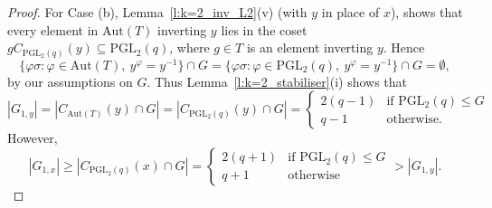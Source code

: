 \documentclass[twoside,a4paper,reqno,11pt]{amsart}
\newcommand{\<}{\langle}
\renewcommand{\>}{\rangle}
\newcommand{\leqs}{\leqslant}
\newcommand{\geqs}{\geqslant}
\newcommand{\Aut}{\mathrm{Aut}}
\newcommand{\PGL}{\mathrm{PGL}}
\theoremstyle{definition}
\begin{document}
\begin{proof}
    For Case (b), 
     Lemma~\ref{l:k=2_inv_L2}(v) (with $y$ in place of $x$), shows that every element in $\Aut(T)$ inverting $y$ lies in the coset $gC_{\PGL_2(q)}(y)\subseteq \PGL_2(q)$, where $g\in T$ is an element inverting $y$. Hence
    \begin{equation*}
        \{\varphi\sigma : \varphi  \in \Aut(T),  \ y^{\varphi} = y^{-1}\}\cap G = \{\varphi\sigma: \varphi \in \PGL_2(q),  \ y^{\varphi} = y^{-1}\}\cap G = \emptyset,
    \end{equation*}
    by  our assumptions on $G$. %
    Thus Lemma~\ref{l:k=2_stabiliser}(i) shows that 
    \begin{equation*}
        |G_{1,y}| = |C_{\Aut(T)}(y)\cap G| = |C_{\PGL_2(q)}(y)\cap G| = 
        \begin{cases}
            2(q-1) & \mbox{if }\PGL_2(q)\leqs G\\
            q-1 & \mbox{otherwise.}
        \end{cases}
    \end{equation*}
    However,
    \begin{equation*}
        |G_{1,x}| \geqs |C_{\PGL_2(q)}(x)\cap G| = 
        \begin{cases}
            2(q+1) & \mbox{if } \PGL_2(q)\leqs G\\
            q+1 & \mbox{otherwise}
        \end{cases}
        > |G_{1,y}|.
    \end{equation*}
 


\end{proof}
\end{document}
